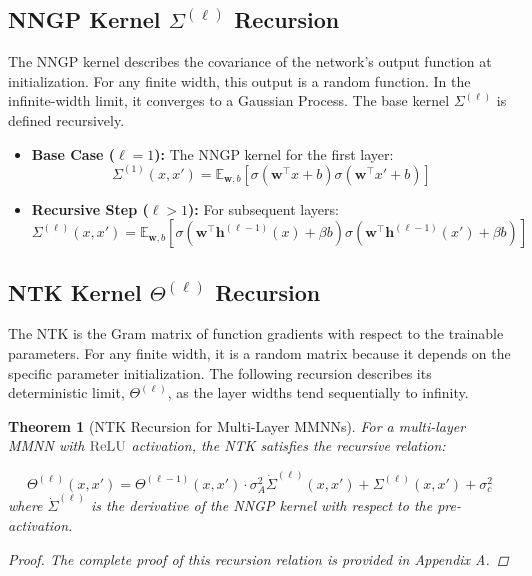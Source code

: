 \documentclass[a4paper]{article}
\newcommand{\ReLU}{\textcolor{relucolor}{\text{ReLU}}}
\DeclareRobustCommand{\ReLU}{\mathrel{\text{%
    \begin{tikzpicture}[baseline=(current bounding box.south)]
        \draw[thick] (0,0) -- (0.25,0) -- (0.4,0.25);
    \end{tikzpicture}}}\!\!}
\theoremstyle{plain}
\newtheorem{theorem}{Theorem}[section]
\theoremstyle{definition}
\theoremstyle{remark}
\begin{document}
\subsection{NNGP Kernel \(\Sigma^{(\ell)}\) Recursion}
The NNGP kernel describes the covariance of the network's output function at initialization. For any finite width, this output is a random function. In the infinite-width limit, it converges to a Gaussian Process. The base kernel $\Sigma^{(\ell)}$ is defined recursively.

\begin{tcolorbox}[colback=blue!10,colframe=blue!80!black,title={\textbf{NNGP Kernel Recursion}},enhanced,drop shadow,boxrule=2pt]
\begin{itemize}
    \item \textbf{Base Case (\(\ell=1\)):} The NNGP kernel for the first layer:
    \begin{equation}
        \boxed{\Sigma^{(1)}(x, x') = \mathbb{E}_{\bm{w},b}\left[\sigma(\bm{w}^\top x + b)\sigma(\bm{w}^\top x' + b)\right]}
    \end{equation}
    \item \textbf{Recursive Step (\(\ell > 1\)):} For subsequent layers:
    \begin{equation}
        \boxed{\Sigma^{(\ell)}(x, x') = \mathbb{E}_{\bm{w}, b} \left[ \sigma\left(\bm{w}^\top \bm{h}^{(\ell-1)}(x) + \beta b\right) \sigma\left(\bm{w}^\top \bm{h}^{(\ell-1)}(x') + \beta b\right) \right]}
    \end{equation}
\end{itemize}
\end{tcolorbox}

\subsection{NTK Kernel \(\Theta^{(\ell)}\) Recursion}
The NTK is the Gram matrix of function gradients with respect to the trainable parameters. For any finite width, it is a random matrix because it depends on the specific parameter initialization. The following recursion describes its deterministic limit, $\Theta^{(\ell)}$, as the layer widths tend sequentially to infinity.

\begin{theorem}[NTK Recursion for Multi-Layer MMNNs]
\label{thm:ntk_recursion}
For a multi-layer MMNN with $\ReLU$ activation, the NTK satisfies the recursive relation:
\begin{tcolorbox}[colback=blue!10,colframe=blue!80!black,title={\textbf{NTK Recursion Formula}},enhanced,drop shadow,boxrule=2pt]
\begin{equation}
\label{eq:ntk_recursion}
\boxed{\Theta^{(\ell)}(x, x') = \Theta^{(\ell-1)}(x, x') \cdot \sigma_A^2 \dot{\Sigma}^{(\ell)}(x, x') + \Sigma^{(\ell)}(x, x') + \sigma_c^2}
\end{equation}
where $\dot{\Sigma}^{(\ell)}$ is the derivative of the NNGP kernel with respect to the pre-activation.
\end{tcolorbox}
\begin{proof}
The complete proof of this recursion relation is provided in Appendix A.
\end{proof}
\end{theorem}
\end{document}
